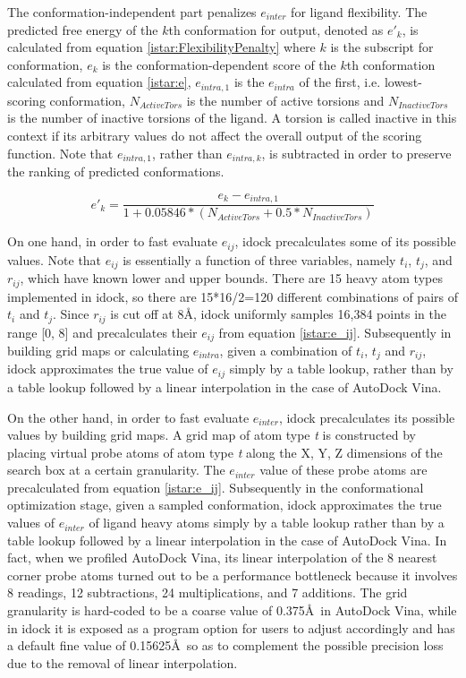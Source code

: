 The conformation-independent part penalizes $e_{inter}$ for ligand flexibility. The predicted free energy of the $k$th conformation for output, denoted as $e'_k$, is calculated from equation \eqref{istar:FlexibilityPenalty} where $k$ is the subscript for conformation, $e_k$ is the conformation-dependent score of the $k$th conformation calculated from equation \eqref{istar:e}, $e_{intra,1}$ is the $e_{intra}$ of the first, i.e. lowest-scoring conformation, $N_{ActiveTors}$ is the number of active torsions and $N_{InactiveTors}$ is the number of inactive torsions of the ligand. A torsion is called inactive in this context if its arbitrary values do not affect the overall output of the scoring function. Note that $e_{intra,1}$, rather than $e_{intra,k}$, is subtracted in order to preserve the ranking of predicted conformations.

\begin{equation}
\label{istar:FlexibilityPenalty}
e'_k = \frac{e_k - e_{intra,1}}{1 + 0.05846 * (N_{ActiveTors} + 0.5 * N_{InactiveTors})}
\end{equation}

On one hand, in order to fast evaluate $e_{ij}$, idock precalculates some of its possible values. Note that $e_{ij}$ is essentially a function of three variables, namely $t_i$, $t_j$, and $r_{ij}$, which have known lower and upper bounds. There are 15 heavy atom types implemented in idock, so there are 15*16/2=120 different combinations of pairs of $t_i$ and $t_j$. Since $r_{ij}$ is cut off at 8\AA, idock uniformly samples 16,384 points in the range [0, 8] and precalculates their $e_{ij}$ from equation \eqref{istar:e_ij}. Subsequently in building grid maps or calculating $e_{intra}$, given a combination of $t_i$, $t_j$ and $r_{ij}$, idock approximates the true value of $e_{ij}$ simply by a table lookup, rather than by a table lookup followed by a linear interpolation in the case of AutoDock Vina.

On the other hand, in order to fast evaluate $e_{inter}$, idock precalculates its possible values by building grid maps. A grid map of atom type \textit{t} is constructed by placing virtual probe atoms of atom type \textit{t} along the X, Y, Z dimensions of the search box at a certain granularity. The $e_{inter}$ value of these probe atoms are precalculated from equation \eqref{istar:e_ij}. Subsequently in the conformational optimization stage, given a sampled conformation, idock approximates the true values of $e_{inter}$ of ligand heavy atoms simply by a table lookup rather than by a table lookup followed by a linear interpolation in the case of AutoDock Vina. In fact, when we profiled AutoDock Vina, its linear interpolation of the 8 nearest corner probe atoms turned out to be a performance bottleneck because it involves 8 readings, 12 subtractions, 24 multiplications, and 7 additions. The grid granularity is hard-coded to be a coarse value of 0.375\AA\ in AutoDock Vina, while in idock it is exposed as a program option for users to adjust accordingly and has a default fine value of 0.15625\AA\ so as to complement the possible precision loss due to the removal of linear interpolation.

